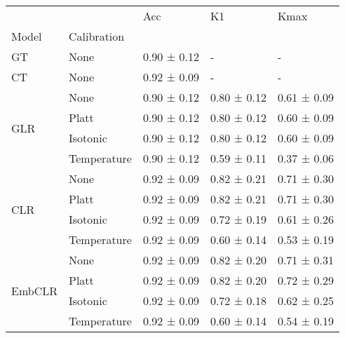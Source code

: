 \begin{tabular}{lllll}
\toprule
 &  & Acc & K1 & Kmax \\
Model & Calibration &  &  &  \\
\midrule
GT & None & 0.90 ± 0.12 & - & - \\
\cline{1-5}
CT & None & 0.92 ± 0.09 & - & - \\
\cline{1-5}
\multirow[t]{4}{*}{GLR} & None & 0.90 ± 0.12 & 0.80 ± 0.12 & 0.61 ± 0.09 \\
 & Platt & 0.90 ± 0.12 & 0.80 ± 0.12 & 0.60 ± 0.09 \\
 & Isotonic & 0.90 ± 0.12 & 0.80 ± 0.12 & 0.60 ± 0.09 \\
 & Temperature & 0.90 ± 0.12 & 0.59 ± 0.11 & 0.37 ± 0.06 \\
\cline{1-5}
\multirow[t]{4}{*}{CLR} & None & 0.92 ± 0.09 & 0.82 ± 0.21 & 0.71 ± 0.30 \\
 & Platt & 0.92 ± 0.09 & 0.82 ± 0.21 & 0.71 ± 0.30 \\
 & Isotonic & 0.92 ± 0.09 & 0.72 ± 0.19 & 0.61 ± 0.26 \\
 & Temperature & 0.92 ± 0.09 & 0.60 ± 0.14 & 0.53 ± 0.19 \\
\cline{1-5}
\multirow[t]{4}{*}{EmbCLR} & None & 0.92 ± 0.09 & 0.82 ± 0.20 & 0.71 ± 0.31 \\
 & Platt & 0.92 ± 0.09 & 0.82 ± 0.20 & 0.72 ± 0.29 \\
 & Isotonic & 0.92 ± 0.09 & 0.72 ± 0.18 & 0.62 ± 0.25 \\
 & Temperature & 0.92 ± 0.09 & 0.60 ± 0.14 & 0.54 ± 0.19 \\
\cline{1-5}
\bottomrule
\end{tabular}

